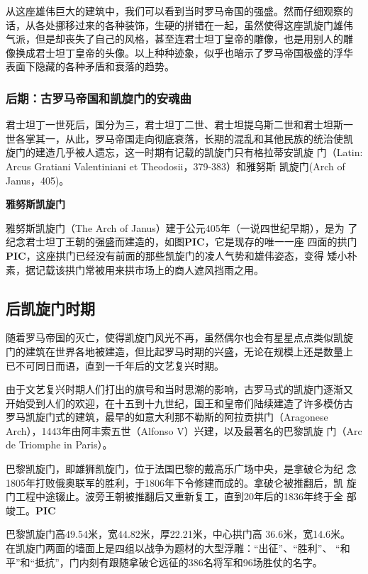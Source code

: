 \documentclass[a4paper,dvipdfm]{article}
\begin{document}
从这座雄伟巨大的建筑中，我们可以看到当时罗马帝国的强盛。然而仔细观察的
话，从各处挪移过来的各种装饰，生硬的拼错在一起，虽然使得这座凯旋门雄伟
气派，但是却丧失了自己的风格，甚至连君士坦丁皇帝的雕像，也是用别人的雕
像换成君士坦丁皇帝的头像。以上种种迹象，似乎也暗示了罗马帝国极盛的浮华
表面下隐藏的各种矛盾和衰落的趋势。

\subsubsection{后期：古罗马帝国和凯旋门的安魂曲}

君士坦丁一世死后，国分为三，君士坦丁二世、君士坦提乌斯二世和君士坦斯一
世各掌其一，从此，罗马帝国走向彻底衰落，长期的混乱和其他民族的统治使凯
旋门的建造几乎被人遗忘，这一时期有记载的凯旋门只有格拉蒂安凯旋
门（Latin: Arcus Gratiani Valentiniani et Theodosii，379-383）和雅努斯
凯旋门(Arch of Janus，405)。


\textbf{雅努斯凯旋门}

雅努斯凯旋门（The Arch of Janus）建于公元405年（一说四世纪早期），是为
了纪念君士坦丁王朝的强盛而建造的，如图\textbf{PIC}，它是现存的唯一一座
四面的拱门\textbf{PIC}，这座拱门已经没有前面的那些凯旋门的凌人气势和雄伟姿态，变得
矮小朴素，据记载该拱门常被用来拱市场上的商人遮风挡雨之用。


\subsection{后凯旋门时期}

随着罗马帝国的灭亡，使得凯旋门风光不再，虽然偶尔也会有星星点点类似凯旋
门的建筑在世界各地被建造，但比起罗马时期的兴盛，无论在规模上还是数量上
已不可同日而语，直到一千年后的文艺复兴时期。

由于文艺复兴时期人们打出的旗号和当时思潮的影响，古罗马式的凯旋门逐渐又
开始受到人们的欢迎，在十五到十九世纪，国王和皇帝们陆续建造了许多模仿古
罗马凯旋门式的建筑，最早的如意大利那不勒斯的阿拉贡拱门（Aragonese
Arch），1443年由阿丰索五世（Alfonso V）兴建，以及最著名的巴黎凯旋
门（Arc de Triomphe in Paris）。

巴黎凯旋门，即雄狮凯旋门，位于法国巴黎的戴高乐广场中央，是拿破仑为纪
念1805年打败俄奥联军的胜利，于1806年下令修建而成的。拿破仑被推翻后，凯
旋门工程中途辍止。波旁王朝被推翻后又重新复工，直到20年后的1836年终于全
部竣工。\textbf{PIC}

巴黎凯旋门高49.54米，宽44.82米，厚22.21米，中心拱门高 36.6米，宽14.6米。
在凯旋门两面的墙面上是四组以战争为题材的大型浮雕：``出征''、``胜利''、
``和平''和``抵抗''，门内刻有跟随拿破仑远征的386名将军和96场胜仗的名字。
\end{document}
